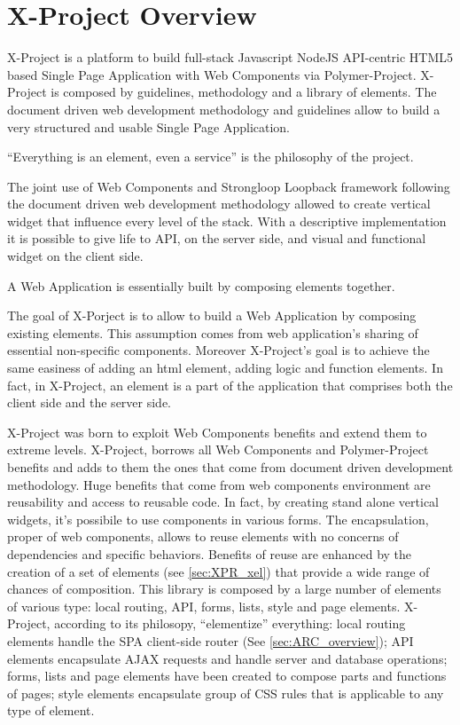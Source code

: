 \section{X-Project Overview}
\label{sec:XPR_xpr}

X-Project is a platform to build full-stack Javascript NodeJS API-centric HTML5 based Single Page Application with Web Components via Polymer-Project.
X-Project is composed by guidelines, methodology and a library of elements.
The document driven web development methodology and guidelines allow to build a very structured and usable Single Page Application.

``Everything is an element, even a service'' is the philosophy of the project.

The joint use of Web Components and Strongloop Loopback framework following the document driven web development methodology allowed to create vertical widget that influence every level of the stack. With a descriptive implementation it is possible to give life to API, on the server side, and visual and functional widget on the client side.

A Web Application is essentially built by composing elements together.

The goal of X-Porject is to allow to build a Web Application by composing existing elements. This assumption comes from web application's sharing of essential non-specific components.
Moreover X-Project's goal is to achieve the same easiness of adding an html element, adding logic and function elements.
In fact, in X-Project, an element is a part of the application that comprises both the client side and the server side.

X-Project was born to exploit Web Components benefits and extend them to extreme levels. X-Project, borrows all Web Components and Polymer-Project benefits and adds to them the ones that come from document driven development methodology.
Huge benefits that come from web components environment are reusability and access to reusable code. In fact, by creating stand alone vertical widgets, it's possibile to use components in various forms.
The encapsulation, proper of web components, allows to reuse elements with no concerns of dependencies and specific behaviors.
Benefits of reuse are enhanced by the creation of a set of elements (see \ref{sec:XPR_xel}) that provide a wide range of chances of composition.
This library is composed by a large number of elements of various type: local routing, API, forms, lists, style and page elements. X-Project, according to its philosopy, ``elementize'' everything: local routing elements handle the SPA client-side router (See \ref{sec:ARC_overview}); API elements encapsulate AJAX requests and handle server and database operations; forms, lists and page elements have been created to compose parts and functions of pages; style elements encapsulate group of CSS rules that is applicable to any type of element.


